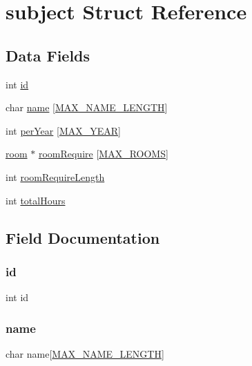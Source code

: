 \hypertarget{structsubject}{}\section{subject Struct Reference}
\label{structsubject}
\subsection*{Data Fields}
\begin{DoxyCompactItemize}
\item 
int \hyperlink{structsubject_a7441ef0865bcb3db9b8064dd7375c1ea}{id}
\item 
char \hyperlink{structsubject_ad50982abf9e9bbbc784f8f17fa25b1b2}{name} \mbox{[}\hyperlink{main_8c_a0c397a708cec89c74029582574516b30}{M\+A\+X\+\_\+\+N\+A\+M\+E\+\_\+\+L\+E\+N\+G\+TH}\mbox{]}
\item 
int \hyperlink{structsubject_a9f7950b8cf851cd516b4139193f73d43}{per\+Year} \mbox{[}\hyperlink{main_8c_a59bcbb5f6896e44dfd79fa63508cfec3}{M\+A\+X\+\_\+\+Y\+E\+AR}\mbox{]}
\item 
\hyperlink{structroom}{room} $\ast$ \hyperlink{structsubject_a5ae5b3c6b809ca65585611691557c8e5}{room\+Require} \mbox{[}\hyperlink{main_8c_a251d94cd24a2ca3369fc3f8eca8c19ae}{M\+A\+X\+\_\+\+R\+O\+O\+MS}\mbox{]}
\item 
int \hyperlink{structsubject_afb17ea87eab6c072f053b2e6c390d873}{room\+Require\+Length}
\item 
int \hyperlink{structsubject_aaa60bc5447f40a6adeacbf85c02b69e2}{total\+Hours}
\end{DoxyCompactItemize}


\subsection{Field Documentation}
\hypertarget{structsubject_a7441ef0865bcb3db9b8064dd7375c1ea}{}\label{structsubject_a7441ef0865bcb3db9b8064dd7375c1ea} 
\subsubsection{\texorpdfstring{id}{id}}
{\footnotesize\ttfamily int id}

\hypertarget{structsubject_ad50982abf9e9bbbc784f8f17fa25b1b2}{}\label{structsubject_ad50982abf9e9bbbc784f8f17fa25b1b2} 
\subsubsection{\texorpdfstring{name}{name}}
{\footnotesize\ttfamily char name\mbox{[}\hyperlink{main_8c_a0c397a708cec89c74029582574516b30}{M\+A\+X\+\_\+\+N\+A\+M\+E\+\_\+\+L\+E\+N\+G\+TH}\mbox{]}}

